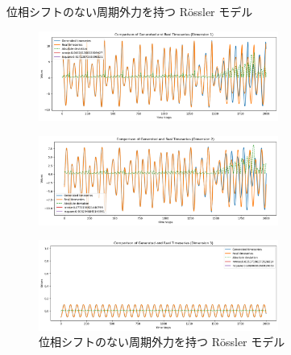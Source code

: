 \begin{frame}{位相シフトのない周期外力を持つ Rössler モデル}  
    \begin{minipage}{0.59\textwidth}
        \vspace{0.5em}
        \begin{figure}
                \includegraphics[width=0.7\textwidth]{Fig/rossler_+sin_1.png}
                \label{rossler_+sin_1.png} %
            \end{figure}
            \vspace{-1.0cm}
            \begin{figure}
                \includegraphics[width=0.7\textwidth]{Fig/rossler_+sin_2.png}
                \label{rossler_+sin_2.png} %
            \end{figure}
            \vspace{-1.0cm}
            \begin{figure}
                \includegraphics[width=0.7\textwidth]{Fig/rossler_+sin_3.png}
                \vspace{-.3em}
                \caption{位相シフトのない周期外力を持つ Rössler モデル}
                \label{rossler_+sin_3.png} %
            \end{figure}
        \end{minipage}
        \begin{minipage}{0.4\textwidth}

\end{minipage}
\end{frame}
